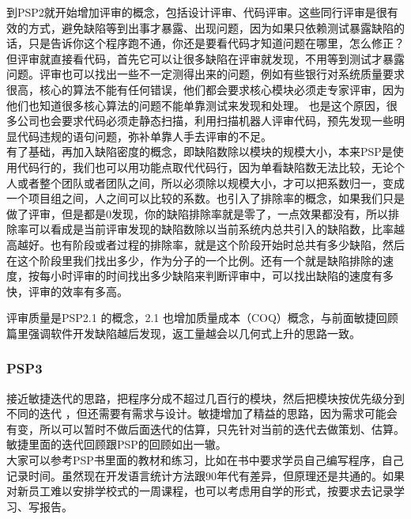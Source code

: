 到PSP2就开始增加评审的概念，包括设计评审、代码评审。这些同行评审是很有效的方式，避免缺陷等到出事才暴露、出现问题，因为如果只依赖测试暴露缺陷的话，只是告诉你这个程序跑不通，你还是要看代码才知道问题在哪里，怎么修正？但评审就直接看代码，首先它可以让很多缺陷在评审就发现，不用等到测试才暴露问题。评审也可以找出一些不一定测得出来的问题，例如有些银行对系统质量要求很高，核心的算法不能有任何错误，他们都会要求核心模块必须走专家评审，因为他们也知道很多核心算法的问题不能单靠测试来发现和处理。
也是这个原因，很多公司也会要求代码必须走静态扫描，利用扫描机器人评审代码，预先发现一些明显代码违规的语句问题，弥补单靠人手去评审的不足。\\
有了基础，再加入缺陷密度的概念，即缺陷数除以模块的规模大小，本来PSP是使用代码行的，我们也可以用功能点取代代码行，因为单看缺陷数无法比较，无论个人或者整个团队或者团队之间，所以必须除以规模大小，才可以把系数归一，变成一个项目组之间，人之间可以比较的系数。也引入了排除率的概念，如果我们只是做了评审，但是都是0发现，你的缺陷排除率就是零了，一点效果都没有，所以排除率可以看成是当前评审发现的缺陷数除以当前系统内总共引入的缺陷数，比率越高越好。也有阶段或者过程的排除率，就是这个阶段开始时总共有多少缺陷，然后在这个阶段里我们找出多少，作为分子的一个比例。还有一个就是缺陷排除的速度，按每小时评审的时间找出多少缺陷来判断评审中，可以找出缺陷的速度有多快，评审的效率有多高。

评审质量是PSP2.1 的概念，2.1
也增加质量成本（COQ）概念，与前面敏捷回顾篇里强调软件开发缺陷越后发现，返工量越会以几何式上升的思路一致。

\hypertarget{psp3}{%
\subsubsection{PSP3}\label{psp3}}

接近敏捷迭代的思路，把程序分成不超过几百行的模块，然后把模块按优先级分到不同的迭代
，但还需要有需求与设计。敏捷增加了精益的思路，因为需求可能会有变，所以可以暂时不做后面迭代的估算，只先针对当前的迭代去做策划、估算。
敏捷里面的迭代回顾跟PSP的回顾如出一辙。\\
大家可以参考PSP书里面的教材和练习，比如在书中要求学员自己编写程序，自己记录时间。虽然现在开发语言统计方法跟90年代有差异，但原理还是共通的。如果对新员工难以安排学校式的一周课程，也可以考虑用自学的形式，按要求去记录学习、写报告。


